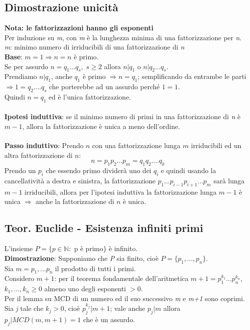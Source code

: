 \subsection{Dimostrazione unicità}
\textbf{Nota: le fattorizzazioni hanno gli esponenti}
\\Per induzione su \textit{m}, con \textit{m} è la lunghezza minima di una fattorizzazione per \textit{n}.
\\
\textit{m}: minimo numero di irriducibili di una fattorizzazione di \textit{n}
\\
\textbf{Base}: \(m=1\Rightarrow n=n\) è primo.
\\
Se per assurdo \(n=q_1...q_s,\; s\geq 2\) allora \(n|q_1\) o \(n|q_2...q_s\).
\\
Prendiamo \(n|q_1\), anche \(q_1\) è primo \(\Rightarrow n=q_1\); semplificando da entrambe le parti \(\Rightarrow 1=q_2....q_s\) che porterebbe ad un assurdo perché \(1=1\).
\\
Quindi \(n=q_1\) ed è l'unica fattorizzazione.
\\\\
\textbf{Ipotesi induttiva}: se il minimo numero di primi in una fattorizzazione di \textit{n} è \(m-1\), allora la fattorizzazione è unica a meno dell'ordine.
\\\\
\textbf{Passo induttivo}: Prendo $n$ con una fattorizzazione lunga $m$ irriducibili ed un altra fattorizzazione di $n$:
\[n=p_1p_2...p_m=q_1q_2....q_k\]
Prendo un $p_i$ che essendo primo dividerà uno dei $q_i$ e quindi usando la cancellatività a destra e sinistra, la fattorizzazione $p_1...p_{i-1}p_{i+1}...p_{m}$ sarà lunga $m-1$ irriducibili, allora per l'ipotesi induttiva la fattorizzazione lunga $m-1$ è unica $\Rightarrow$ anche la fattorizzazione di $n$ è unica.


\subsection{Teor. Euclide - Esistenza infiniti primi}
L'insieme \(P=\{p\in\mathbb{N} :\) p è primo\(\}\) è infinito.
\\
\textbf{Dimostrazione}: Supponiamo che \textit{P} sia finito, cioè \(P=\{p_1,...,p_n\}\).
\\
Sia \(m=p_1,...p_n\) il prodotto di tutti i primi.
\\
Considero \(m+1\): per il teorema fondamentale dell'aritmetica \(m+1=p_1^{k_1}...p_n^{k_n}\), \(k_1,...,k_n\geq 0\) almeno uno degli esponenti \(>0\).
\\
Per il lemma su MCD di un numero ed il suo successivo \textit{m} e \textit{m+1} sono coprimi.
\\
Sia \textit{j} tale che \(k_j>0\), cioè \(p_j^{k_j}|m+1\); vale anche \(p_j|m\) allora \(p_j|MCD(m, m+1)=1\) che è un assurdo.
